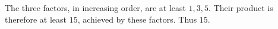 The three factors, in increasing order, are at least $1,3,5$. Their product is therefore at least $15$, achieved by these factors. Thus $\boxed{15}$.

